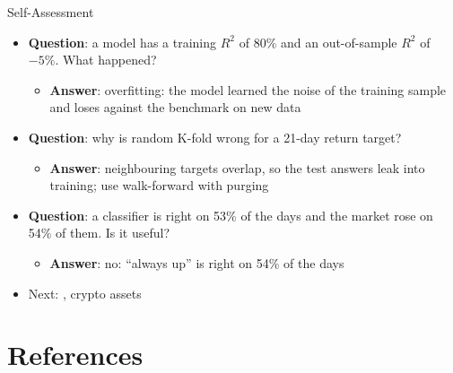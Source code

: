 \begin{frame}{Self-Assessment}
\itemsize{\small}
\begin{itemize}
    \item \textbf{Question}: a model has a training $R^2$ of 80\% and an out-of-sample $R^2$ of $-5\%$. What happened?
    \begin{itemize}
        \item \textbf{Answer}: overfitting: the model learned the noise of the training sample and loses against the benchmark on new data
    \end{itemize}
    \item \textbf{Question}: why is random K-fold wrong for a 21-day return target?
    \begin{itemize}
        \item \textbf{Answer}: neighbouring targets overlap, so the test answers leak into training; use walk-forward with purging
    \end{itemize}
    \item \textbf{Question}: a classifier is right on 53\% of the days and the market rose on 54\% of them. Is it useful?
    \begin{itemize}
        \item \textbf{Answer}: no: ``always up'' is right on 54\% of the days
    \end{itemize}
    \item Next: , crypto assets
\end{itemize}
\end{frame}


\section{References}


